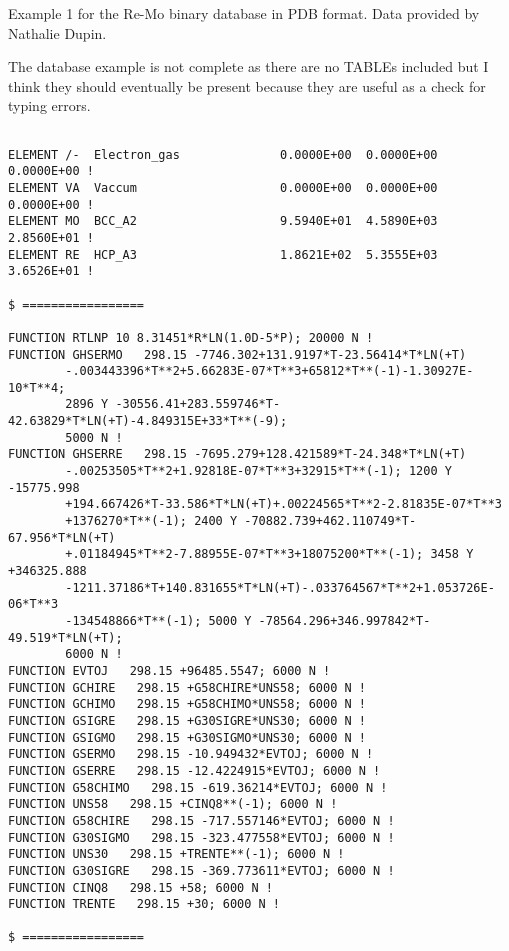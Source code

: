 \documentclass[12pt]{article}
\begin{document}
Example 1 for the Re-Mo binary database in PDB format.  Data provided
by Nathalie Dupin.

The database example is not complete as there are no TABLEs included
but I think they should eventually be present because they are useful
as a check for typing errors.

{\small
\begin{verbatim}

ELEMENT /-  Electron_gas              0.0000E+00  0.0000E+00  0.0000E+00 !
ELEMENT VA  Vaccum                    0.0000E+00  0.0000E+00  0.0000E+00 !
ELEMENT MO  BCC_A2                    9.5940E+01  4.5890E+03  2.8560E+01 !
ELEMENT RE  HCP_A3                    1.8621E+02  5.3555E+03  3.6526E+01 !

$ =================

FUNCTION RTLNP 10 8.31451*R*LN(1.0D-5*P); 20000 N !
FUNCTION GHSERMO   298.15 -7746.302+131.9197*T-23.56414*T*LN(+T)
        -.003443396*T**2+5.66283E-07*T**3+65812*T**(-1)-1.30927E-10*T**4; 
        2896 Y -30556.41+283.559746*T-42.63829*T*LN(+T)-4.849315E+33*T**(-9); 
        5000 N !
FUNCTION GHSERRE   298.15 -7695.279+128.421589*T-24.348*T*LN(+T)
        -.00253505*T**2+1.92818E-07*T**3+32915*T**(-1); 1200 Y -15775.998
        +194.667426*T-33.586*T*LN(+T)+.00224565*T**2-2.81835E-07*T**3
        +1376270*T**(-1); 2400 Y -70882.739+462.110749*T-67.956*T*LN(+T)
        +.01184945*T**2-7.88955E-07*T**3+18075200*T**(-1); 3458 Y +346325.888
        -1211.37186*T+140.831655*T*LN(+T)-.033764567*T**2+1.053726E-06*T**3
        -134548866*T**(-1); 5000 Y -78564.296+346.997842*T-49.519*T*LN(+T); 
        6000 N !
FUNCTION EVTOJ   298.15 +96485.5547; 6000 N !
FUNCTION GCHIRE   298.15 +G58CHIRE*UNS58; 6000 N !
FUNCTION GCHIMO   298.15 +G58CHIMO*UNS58; 6000 N !
FUNCTION GSIGRE   298.15 +G30SIGRE*UNS30; 6000 N !
FUNCTION GSIGMO   298.15 +G30SIGMO*UNS30; 6000 N !
FUNCTION GSERMO   298.15 -10.949432*EVTOJ; 6000 N !
FUNCTION GSERRE   298.15 -12.4224915*EVTOJ; 6000 N !
FUNCTION G58CHIMO   298.15 -619.36214*EVTOJ; 6000 N !
FUNCTION UNS58   298.15 +CINQ8**(-1); 6000 N !
FUNCTION G58CHIRE   298.15 -717.557146*EVTOJ; 6000 N !
FUNCTION G30SIGMO   298.15 -323.477558*EVTOJ; 6000 N !
FUNCTION UNS30   298.15 +TRENTE**(-1); 6000 N !
FUNCTION G30SIGRE   298.15 -369.773611*EVTOJ; 6000 N !
FUNCTION CINQ8   298.15 +58; 6000 N !
FUNCTION TRENTE   298.15 +30; 6000 N !

$ =================


\end{verbatim}}
\end{document}
